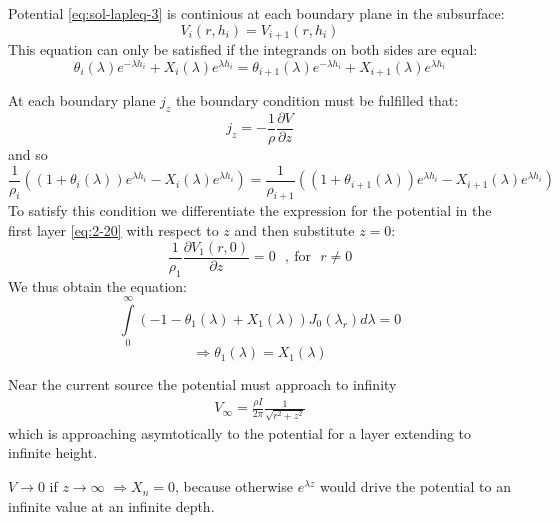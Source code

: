 \begin{compactenum}[A)]
\item Potential \eqref{eq:sol-lapleq-3} is continious at each boundary plane in the subsurface:
\begin{equation}
V_i(r,h_i)=V_{i+1}(r,h_i)
\end{equation}
This equation can only be satisfied if the integrands on both sides are equal:
\begin{equation}
\theta_i(\lambda)e^{-\lambda h_i}+X_i(\lambda)e^{\lambda h_i}=\theta_{i+1}(\lambda)e^{-\lambda h_i}+X_{i+1}(\lambda)e^{\lambda h_i} \label{eq:boundary-2-23A}
\end{equation}
\item At each boundary plane $j_z$ the boundary condition must be fulfilled that:
\begin{equation}
j_z=-\frac{1}{\rho}\frac{\partial V}{\partial z}
\end{equation} 
and so
\begin{equation}
\frac{1}{\rho_i}\left(\left(1+\theta_i(\lambda)\right)e^{\lambda h_i}-X_i(\lambda)e^{\lambda h_i}\right)=\frac{1}{\rho_{i+1}}\left(\left(1+\theta_{i+1}(\lambda)\right)e^{\lambda h_i}-X_{i+1}(\lambda)e^{\lambda h_i}\right) \label{eq:boundary-2-23B}
\end{equation}
To satisfy this condition we differentiate the expression for the potential in the first layer \eqref{eq:2-20} with respect to $z$ and then substitute $z=0$:
\begin{equation}
\frac{1}{\rho_1}\frac{\partial V_1(r,0)}{\partial z}=0 ~~~,~ \textrm{for~~} r\neq 0
\end{equation}
We thus obtain the equation:
\begin{equation}
\int\limits_{0}^{\infty}\left(-1-\theta_1(\lambda)+X_1(\lambda)\right) J_0(\lambda_r)d\lambda=0
\end{equation}
\begin{equation}
\Rightarrow \theta_1(\lambda)=X_1(\lambda)
\end{equation}

\item Near the current source the potential must approach to infinity
\begin{align*}
V_\infty=\frac{\rho I}{2\pi}\frac{1}{\sqrt{r^2+z^2}}
\end{align*}
which is approaching asymtotically to the potential for a layer extending to infinite height.

\item $V\rightarrow 0$ if $z\rightarrow\infty$ $\Rightarrow X_n=0$, because otherwise $e^{\lambda z}$ would drive the potential to an infinite value at an infinite depth.

\end{compactenum}